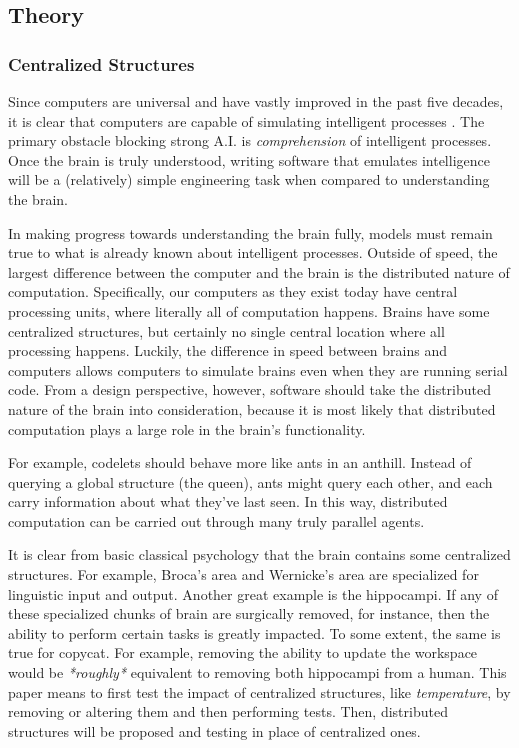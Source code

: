 \documentclass[a4paper]{article}
\begin{document}
\subsection{Theory}

    \subsubsection{Centralized Structures}

    Since computers are universal and have vastly improved in the past five decades, it is clear that computers are capable of simulating intelligent processes \cite{computerandthebrain}.
    The primary obstacle blocking strong A.I. is \emph{comprehension} of intelligent processes. 
    Once the brain is truly understood, writing software that emulates intelligence will be a (relatively) simple engineering task when compared to understanding the brain. 

    In making progress towards understanding the brain fully, models must remain true to what is already known about intelligent processes.
    Outside of speed, the largest difference between the computer and the brain is the distributed nature of computation. 
    Specifically, our computers as they exist today have central processing units, where literally all of computation happens. 
    Brains have some centralized structures, but certainly no single central location where all processing happens. 
    Luckily, the difference in speed between brains and computers allows computers to simulate brains even when they are running serial code.
    From a design perspective, however, software should take the distributed nature of the brain into consideration, because it is most likely that distributed computation plays a large role in the brain's functionality.

    For example, codelets should behave more like ants in an anthill.
    Instead of querying a global structure (the queen), ants might query each other, and each carry information about what they've last seen.
    In this way, distributed computation can be carried out through many truly parallel agents.

    It is clear from basic classical psychology that the brain contains some centralized structures.
    For example, Broca's area and Wernicke's area are specialized for linguistic input and output.
    Another great example is the hippocampi.
    If any of these specialized chunks of brain are surgically removed, for instance, then the ability to perform certain tasks is greatly impacted.
    To some extent, the same is true for copycat.
    For example, removing the ability to update the workspace would be \emph{*roughly*} equivalent to removing both hippocampi from a human.
    This paper means to first test the impact of centralized structures, like \emph{temperature}, by removing or altering them and then performing tests.
    Then, distributed structures will be proposed and testing in place of centralized ones.
\end{document}
